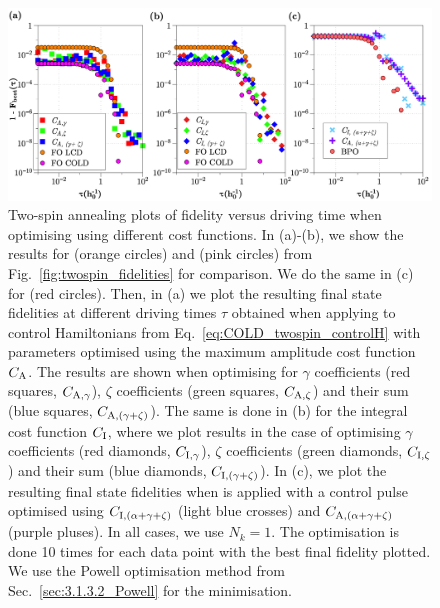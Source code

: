 \begin{figure}[t]
    \centering
    \includegraphics[width=\linewidth]{images/twospin_HO_scatter.png} \caption[Two-spin annealing plots of fidelity versus driving time when minimising different orders of LCD.]{Two-spin annealing plots of fidelity versus driving time when optimising using different cost functions. In (a)-(b), we show the results for   (orange circles) and   (pink circles) from Fig.~\ref{fig:twospin_fidelities} for comparison. We do the same in (c) for  (red circles). Then, in (a) we plot the resulting final state fidelities at different driving times $\tau$ obtained when applying   to control Hamiltonians from Eq.~\eqref{eq:COLD_twospin_controlH} with parameters optimised using the maximum amplitude cost function $C_{\rm A}$. The results are shown when optimising for $\gamma$ coefficients (red squares, $C_{\rm A, \gamma}$), $\zeta$ coefficients (green squares, $C_{\rm A, \zeta}$) and their sum (blue squares, $C_{\rm A, (\gamma + \zeta)}$). The same is done in (b) for the integral cost function $C_{\rm I}$, where we plot results in the case of optimising $\gamma$ coefficients (red diamonds, $C_{\rm I, \gamma}$), $\zeta$ coefficients (green diamonds, $C_{\rm I, \zeta}$) and their sum (blue diamonds, $C_{\rm I, (\gamma + \zeta)}$). In (c), we plot the resulting final state fidelities when  is applied with a control pulse optimised using $C_{\rm I, (\alpha + \gamma + \zeta)}$ (light blue crosses) and $C_{\rm A, (\alpha + \gamma + \zeta)}$ (purple pluses). In all cases, we use $N_k = 1$. The optimisation is done 10 times for each data point with the best final fidelity plotted. We use the Powell optimisation method from Sec.~\ref{sec:3.1.3.2_Powell} for the minimisation.}\label{fig:twospin_scatter}
\end{figure}


